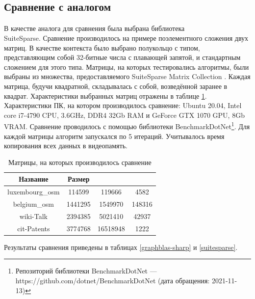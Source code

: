 \documentclass[14pt]{matmex-diploma-custom}
\begin{document}
\subsection{Сравнение с аналогом}
\paragraph{}В качестве аналога для сравнения была выбрана библиотека\\ SuiteSparse. Сравнение производилось на примере поэлементного сложения двух матриц. В качестве контекста было выбрано полукольцо с типом, представляющим собой 32-битные числа с плавающей запятой, и стандартным сложением для этого типа. Матрицы, на которых тестировались алгоритмы, были выбраны из множества, предоставляемого SuiteSparse Matrix Collection \cite{DavidTimothy}. Каждая матрица, будучи квадратной, складывалась с собой, возведённой заранее в квадрат. Характеристики выбранных матриц отражены в таблице \ref{matrices}. Характеристики ПК, на котором производилось сравнение: Ubuntu 20.04, Intel core i7-4790 CPU, 3.6GHz, DDR4 32Gb RAM и GeForce GTX 1070 GPU, 8Gb VRAM. Сравнение проводилось с помощью библиотеки BenchmarkDotNet\footnote{Репозиторий библиотеки BenchmarkDotNet --- https://github.com/dotnet/BenchmarkDotNet (дата обращения: 2021-11-13)}. Для каждой матрицы алгоритм запускался по 5 итераций. Учитывалось время копирования всех данных в видеопамять.
 
\begin{table}[h]
\center{}

\begin{tabular}{ | c | c | c | c | }
\hline
Название & Размер & \parbox[c][2.5cm][t]{3cm}{} & \parbox[c][3.5cm][t]{3cm}{} \\ \hline
luxembourg\_osm & 114599 & 119666 & 4582 \\ \hline
belgium\_osm & 1441295 & 1549970 & 148316 \\ \hline
wiki-Talk & 2394385 & 5021410 & 42937 \\ \hline
cit-Patents & 3774768 & 16518948 & 1222 \\ \hline
\end{tabular}

\caption{Матрицы, на которых производилось сравнение}
\label{matrices}
\end{table}

Результаты сравнения приведены в таблицах \ref{graphblas-sharp} и \ref{suitesparse}.
\end{document}
